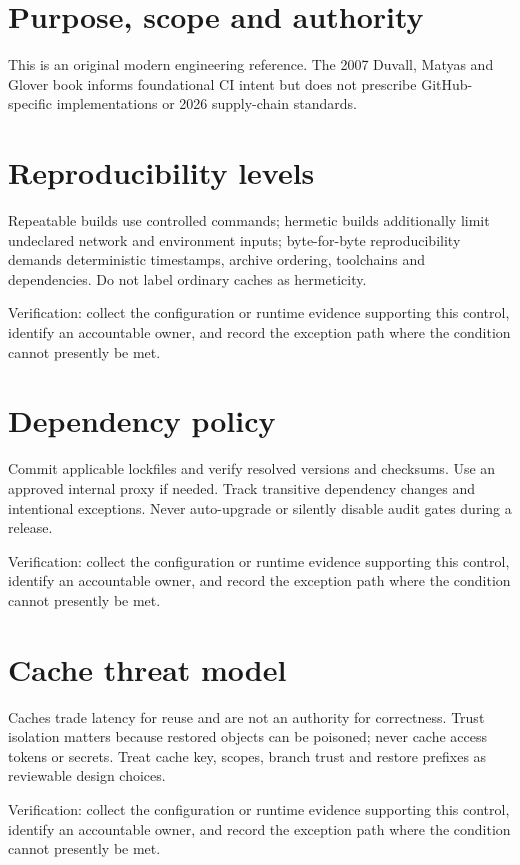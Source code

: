 \documentclass[11pt,letterpaper]{article}
\begin{document}
\makedoctitle
\makedocsummary
\tableofcontents
\clearpage
\section{Purpose, scope and authority}
This is an original modern engineering reference. The 2007 Duvall, Matyas and Glover book informs foundational CI intent but does not prescribe GitHub-specific implementations or 2026 supply-chain standards.

\section{Reproducibility levels}
Repeatable builds use controlled commands; hermetic builds additionally limit undeclared network and environment inputs; byte-for-byte reproducibility demands deterministic timestamps, archive ordering, toolchains and dependencies. Do not label ordinary caches as hermeticity.

Verification: collect the configuration or runtime evidence supporting this control, identify an accountable owner, and record the exception path where the condition cannot presently be met.

\section{Dependency policy}
Commit applicable lockfiles and verify resolved versions and checksums. Use an approved internal proxy if needed. Track transitive dependency changes and intentional exceptions. Never auto-upgrade or silently disable audit gates during a release.

Verification: collect the configuration or runtime evidence supporting this control, identify an accountable owner, and record the exception path where the condition cannot presently be met.

\section{Cache threat model}
Caches trade latency for reuse and are not an authority for correctness. Trust isolation matters because restored objects can be poisoned; never cache access tokens or secrets. Treat cache key, scopes, branch trust and restore prefixes as reviewable design choices.

Verification: collect the configuration or runtime evidence supporting this control, identify an accountable owner, and record the exception path where the condition cannot presently be met.
\end{document}
